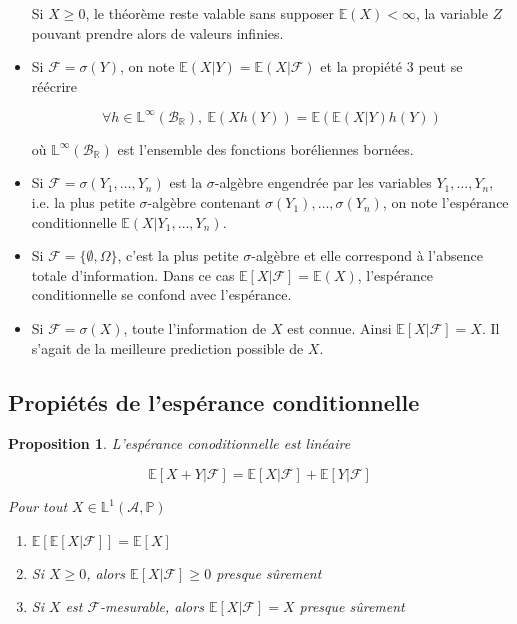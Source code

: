 \documentclass[10pt,a4paper,oneside]{article}
\newtheorem{proposition}{Proposition}
\begin{document}
\begin{itemize}
Si $X \geq 0$, le théorème reste valable sans supposer $\mathbb{E}(X) < \infty$, la variable $Z$ pouvant prendre alors de valeurs infinies.

\item
Si $\mathcal{F} = \sigma(Y)$, on note $\mathbb{E}(X | Y) = \mathbb{E}(X | \mathcal{F})$ et la propiété 3 peut se réécrire

\[ \forall h \in \mathbb{L}^\infty(\mathcal{B}_\mathbb{R}),\ \mathbb{E}(X h(Y)) = \mathbb{E}( \mathbb{E}(X | Y) h(Y) ) \]

où $\mathbb{L}^\infty(\mathcal{B}_\mathbb{R})$ est l'ensemble des fonctions boréliennes bornées.

\item
Si $\mathcal{F} = \sigma(Y_1,\ldots,Y_n)$ est la $\sigma$-algèbre engendrée par les variables $Y_1,\ldots,Y_n$, i.e. la plus petite $\sigma$-algèbre contenant $\sigma(Y_1),\ldots,\sigma(Y_n)$, on note l'espérance conditionnelle $\mathbb{E}(X | Y_1,\ldots,Y_n)$.

\item
Si $\mathcal{F} = \{ \emptyset, \Omega \}$, c'est la plus petite $\sigma$-algèbre et elle correspond à l'absence totale d'information. Dans ce cas $\mathbb{E}[X | \mathcal{F}] = \mathbb{E}(X)$, l'espérance conditionnelle se confond avec l'espérance.

\item
Si $\mathcal{F} = \sigma(X)$, toute l'information de $X$ est connue. Ainsi $\mathbb{E}[X | \mathcal{F}] = X$. Il s'agait de la meilleure prediction possible de $X$.
\end{itemize}

\subsection{Propiétés de l'espérance conditionnelle}

\begin{proposition}
L'espérance conoditionnelle est linéaire

\[ \mathbb{E}[X + Y | \mathcal{F}] = \mathbb{E}[X | \mathcal{F}] + \mathbb{E}[Y | \mathcal{F}] \]

Pour tout $X \in \mathbb{L}^1(\mathcal{A},\mathbb{P})$

\begin{enumerate}
\item
$\mathbb{E}[ \mathbb{E}[X | \mathcal{F} ] ] = \mathbb{E}[X]$
\item
Si $X \geq 0$, alors $\mathbb{E}[X |\mathcal{F}] \geq 0$ presque sûrement
\item
Si $X$ est $\mathcal{F}$-mesurable, alors $\mathbb{E}[X | \mathcal{F}] = X$ presque sûrement
\end{enumerate}

\end{proposition}
\end{document}
